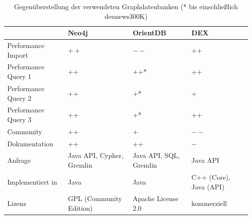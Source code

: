 \documentclass[11pt, a4paper, oneside]{article} %
\begin{document}
\renewcommand{\arraystretch}{1.5}

\begin{table}[ht]
\begin{tabular}{|l||p{2.5cm}|p{2.5cm}|p{2.5cm}|}
\hline 
 & \textbf{Neo4j} & \textbf{OrientDB} & \textbf{DEX} \\ 
\hline
Performance Import & $++$ & $--$ & ++ \\ 
\hline 
Performance Query 1 & ++ & ++* & ++ \\ 
\hline 
Performance Query 2 & ++ & +* & + \\ 
\hline 
Performance Query 3 & ++ & +* & ++ \\ 
\hline
Community & ++ & + & $--$ \\ 
\hline 
Dokumentation & ++ & ++ & $-$ \\
\hline 
Anfrage & Java API, Cypher, Gremlin & Java API, SQL, Gremlin & Java API \\
\hline
Implementiert in & Java & Java & C++ (Core), Java (API) \\
\hline 
Lizenz & GPL (Community Edition) & Apache License 2.0 & kommerziell	 \\ 
\hline 
\end{tabular}
\caption{Gegenüberstellung der verwendeten Graphdatenbanken (* bis einschließlich deu\textunderscore news\textunderscore 300K)}
\label{tab:compare}
\end{table}

\newpage
\onecolumn
\end{document}
